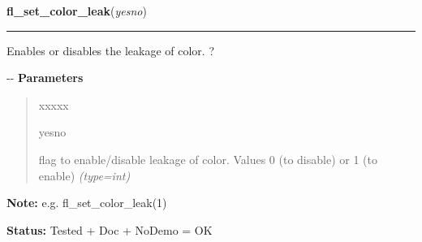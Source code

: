     \label{xformslib:flbasic:fl_set_color_leak}

    \vspace{0.5ex}

\hspace{.8\funcindent}\begin{boxedminipage}{\funcwidth}

    \raggedright \textbf{fl\_set\_color\_leak}(\textit{yesno})

    \vspace{-1.5ex}

    \rule{\textwidth}{0.5\fboxrule}
\setlength{\parskip}{2ex}

Enables or disables the leakage of color. ?

-{}-
\setlength{\parskip}{1ex}
      \textbf{Parameters}
      \vspace{-1ex}

      \begin{quote}
        \begin{Ventry}{xxxxx}

          \item[yesno]


flag to enable/disable leakage of color. Values 0 (to disable) or 1
(to enable)
            {\it (type=int)}

        \end{Ventry}

      \end{quote}

\textbf{Note:} 
e.g. fl\_set\_color\_leak(1)


\textbf{Status:} 
Tested + Doc + NoDemo = OK


    \end{boxedminipage}

    \label{xformslib:flbasic:fl_getmcolor}

    \vspace{0.5ex}


